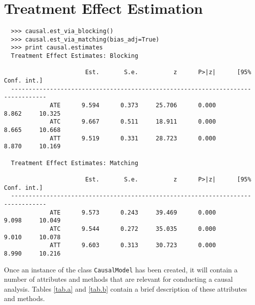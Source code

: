 \documentclass[12pt]{article}
\theoremstyle{definition}
\theoremstyle{definition}
\theoremstyle{definition}
\theoremstyle{remark}
\begin{document}
\section*{Treatment Effect Estimation}

\begin{verbatim}
  >>> causal.est_via_blocking()
  >>> causal.est_via_matching(bias_adj=True)
  >>> print causal.estimates
  Treatment Effect Estimates: Blocking
  
                       Est.       S.e.          z      P>|z|      [95% Conf. int.]
  --------------------------------------------------------------------------------
             ATE      9.594      0.373     25.706      0.000      8.862     10.325
             ATC      9.667      0.511     18.911      0.000      8.665     10.668
             ATT      9.519      0.331     28.723      0.000      8.870     10.169
  
  Treatment Effect Estimates: Matching
  
                       Est.       S.e.          z      P>|z|      [95% Conf. int.]
  --------------------------------------------------------------------------------
             ATE      9.573      0.243     39.469      0.000      9.098     10.049
             ATC      9.544      0.272     35.035      0.000      9.010     10.078
             ATT      9.603      0.313     30.723      0.000      8.990     10.216
\end{verbatim}

Once an instance of the class \texttt{CausalModel} has been created, it will contain a number of attributes and methods that are relevant for conducting a causal analysis. Tables \ref{tab.a} and \ref{tab.b} contain a brief description of these attributes and methods. \\
\end{document}
